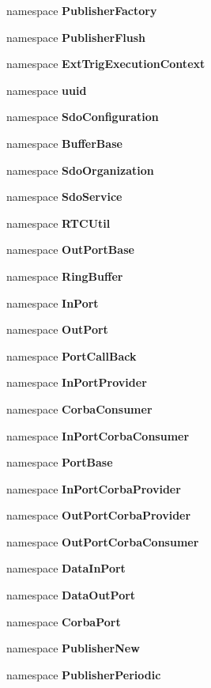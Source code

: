 \begin{CompactItemize}
\item 
namespace {\bf Publisher\-Factory}
\item 
namespace {\bf Publisher\-Flush}
\item 
namespace {\bf Ext\-Trig\-Execution\-Context}
\item 
namespace {\bf uuid}
\item 
namespace {\bf Sdo\-Configuration}
\item 
namespace {\bf Buffer\-Base}
\item 
namespace {\bf Sdo\-Organization}
\item 
namespace {\bf Sdo\-Service}
\item 
namespace {\bf RTCUtil}
\item 
namespace {\bf Out\-Port\-Base}
\item 
namespace {\bf Ring\-Buffer}
\item 
namespace {\bf In\-Port}
\item 
namespace {\bf Out\-Port}
\item 
namespace {\bf Port\-Call\-Back}
\item 
namespace {\bf In\-Port\-Provider}
\item 
namespace {\bf Corba\-Consumer}
\item 
namespace {\bf In\-Port\-Corba\-Consumer}
\item 
namespace {\bf Port\-Base}
\item 
namespace {\bf In\-Port\-Corba\-Provider}
\item 
namespace {\bf Out\-Port\-Corba\-Provider}
\item 
namespace {\bf Out\-Port\-Corba\-Consumer}
\item 
namespace {\bf Data\-In\-Port}
\item 
namespace {\bf Data\-Out\-Port}
\item 
namespace {\bf Corba\-Port}
\item 
namespace {\bf Publisher\-New}
\item 
namespace {\bf Publisher\-Periodic}
\end{CompactItemize}
